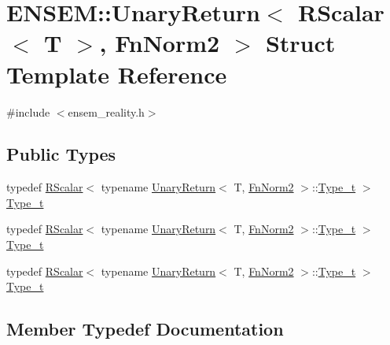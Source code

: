 \hypertarget{structENSEM_1_1UnaryReturn_3_01RScalar_3_01T_01_4_00_01FnNorm2_01_4}{}\section{E\+N\+S\+EM\+:\+:Unary\+Return$<$ R\+Scalar$<$ T $>$, Fn\+Norm2 $>$ Struct Template Reference}
\label{structENSEM_1_1UnaryReturn_3_01RScalar_3_01T_01_4_00_01FnNorm2_01_4}


{\ttfamily \#include $<$ensem\+\_\+reality.\+h$>$}

\subsection*{Public Types}
\begin{DoxyCompactItemize}
\item 
typedef \mbox{\hyperlink{classENSEM_1_1RScalar}{R\+Scalar}}$<$ typename \mbox{\hyperlink{structENSEM_1_1UnaryReturn}{Unary\+Return}}$<$ T, \mbox{\hyperlink{structENSEM_1_1FnNorm2}{Fn\+Norm2}} $>$\+::\mbox{\hyperlink{structENSEM_1_1UnaryReturn_3_01RScalar_3_01T_01_4_00_01FnNorm2_01_4_a0b95acf355311a4c109012c267496961}{Type\+\_\+t}} $>$ \mbox{\hyperlink{structENSEM_1_1UnaryReturn_3_01RScalar_3_01T_01_4_00_01FnNorm2_01_4_a0b95acf355311a4c109012c267496961}{Type\+\_\+t}}
\item 
typedef \mbox{\hyperlink{classENSEM_1_1RScalar}{R\+Scalar}}$<$ typename \mbox{\hyperlink{structENSEM_1_1UnaryReturn}{Unary\+Return}}$<$ T, \mbox{\hyperlink{structENSEM_1_1FnNorm2}{Fn\+Norm2}} $>$\+::\mbox{\hyperlink{structENSEM_1_1UnaryReturn_3_01RScalar_3_01T_01_4_00_01FnNorm2_01_4_a0b95acf355311a4c109012c267496961}{Type\+\_\+t}} $>$ \mbox{\hyperlink{structENSEM_1_1UnaryReturn_3_01RScalar_3_01T_01_4_00_01FnNorm2_01_4_a0b95acf355311a4c109012c267496961}{Type\+\_\+t}}
\item 
typedef \mbox{\hyperlink{classENSEM_1_1RScalar}{R\+Scalar}}$<$ typename \mbox{\hyperlink{structENSEM_1_1UnaryReturn}{Unary\+Return}}$<$ T, \mbox{\hyperlink{structENSEM_1_1FnNorm2}{Fn\+Norm2}} $>$\+::\mbox{\hyperlink{structENSEM_1_1UnaryReturn_3_01RScalar_3_01T_01_4_00_01FnNorm2_01_4_a0b95acf355311a4c109012c267496961}{Type\+\_\+t}} $>$ \mbox{\hyperlink{structENSEM_1_1UnaryReturn_3_01RScalar_3_01T_01_4_00_01FnNorm2_01_4_a0b95acf355311a4c109012c267496961}{Type\+\_\+t}}
\end{DoxyCompactItemize}


\subsection{Member Typedef Documentation}
\mbox{\label{structENSEM_1_1UnaryReturn_3_01RScalar_3_01T_01_4_00_01FnNorm2_01_4_a0b95acf355311a4c109012c267496961}} 
